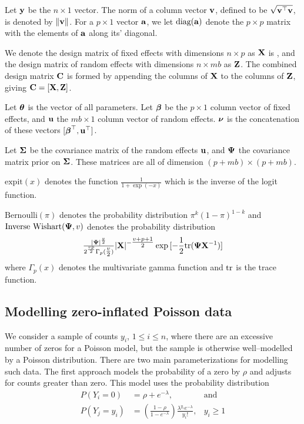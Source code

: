 Let ${\bf y}$ be the $n \times 1$ vector. The norm of a column vector ${\bf v}$, defined to be $\sqrt{{\bf v}^\top {\bf v}}$,
is  denoted by $\|{\bf v}\|$. For a $p \times 1$ vector ${\bf a}$, we let $\text{diag}{({\bf a})}$ denote the $p \times p$
matrix with the elements of ${\bf a}$ along its' diagonal.

We denote the design matrix of fixed effects with dimensions $n \times p$ as ${\bf X}$ is , and the design matrix
of random  effects with dimensions $n \times m b$ as ${\bf Z}$. The combined design matrix ${\bf C}$ is formed by
appending the columns of ${\bf X}$ to the columns of ${\bf Z}$, giving ${\bf C} = [ {\bf X}, {\bf Z} ]$.

Let ${\boldsymbol \theta}$ is the vector of all parameters.
Let ${\boldsymbol \beta}$ be the $p \times 1$ column vector of fixed
effects, and ${\bf u}$ the $m b \times 1$ column vector of random effects. ${\boldsymbol \nu}$ is the
concatenation of these vectors $[{\boldsymbol \beta}^\top, {\bf u}^\top]$.

Let ${\boldsymbol \Sigma}$ be the covariance matrix of the random effects ${\bf u}$,
and 
${\boldsymbol \Psi}$ the covariance matrix prior on ${\boldsymbol \Sigma}$.
These matrices are all of dimension $(p + m b) \times (p + m b)$.


$\text{expit}(x)$ denotes the function $\tfrac{1}{1 + \exp(-x)}$ which is the inverse of the logit
function.

$\text{Bernoulli}(\pi)$ denotes the probability distribution $\pi^k (1 - \pi)^{1-k}$ and
$\text{Inverse Wishart}({\boldsymbol \Psi}, v)$ denotes the probability distribution
$$\tfrac{|{\boldsymbol \Psi}|^\frac{v}{2}}{2^{\frac{vp}{2}} \Gamma_p{(\tfrac{v}{2})}} |{\bf X}|^{-\tfrac{v + p + 1}{2}}
\exp{[-\frac{1}{2} \text{tr}{({\boldsymbol\Psi}{\bf X}^{-1})}]}$$ where $\Gamma_p{(x)}$ denotes the multivariate gamma function and $\text{tr}$
is the trace function.

\subsection{Modelling zero-inflated Poisson data}

We consider a sample of counts $y_i$, $1 \le i\le n$, where there are an excessive number of zeros for a
Poisson model, but the sample is otherwise well--modelled by a Poisson distribution. There are two main
parameterizations for modelling such data. The first approach models the probability of a zero by $\rho$ and
adjusts for counts greater than zero. This model uses the probability distribution
$$
\begin{array}{rll}
	P(Y_i = 0) &= \rho + e^{-\lambda}, &\mbox{and} \\
	P(Y_j = y_i) &= \left( \frac{1 - \rho}{1 - e^{-\lambda}} \right) \frac{\lambda^{y_i} e^{-\lambda}} {y_i!}, &y_i \ge 1
\end{array}
$$

